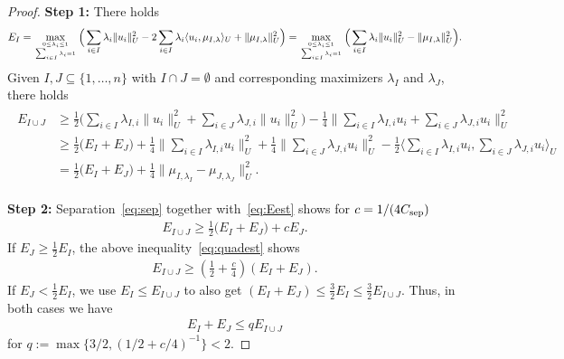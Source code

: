 \documentclass[10pt,reqno]{amsart}
\theoremstyle{definition}
\theoremstyle{remark}
\newcommand{\norm}[1]{\lVert #1\rVert}
\newcommand{\dual}[2]{\langle #1,#2\rangle}
\begin{document}
\begin{proof}
    \textbf{Step 1:} 
    There holds
    \begin{align}
        E_I = \max_{0\leq \lambda_i\leq 1\atop \sum_{i\in I} \lambda_i = 1}\Big(\sum_{i\in I}\lambda_i \norm{u_i}_U^2  - 2\sum_{i\in I}\lambda_i \dual{u_i}{\mu_{I,\lambda}}_U+\norm{\mu_{I,\lambda}}_U^2\Big) = \max_{0\leq \lambda_i\leq 1\atop \sum_{i\in I} \lambda_i = 1} \Big(\sum_{i\in I}\lambda_i \norm{u_i}_U^2  - \norm{\mu_{I,\lambda}}_U^2\Big). 
    \end{align}
    Given $I,J\subseteq \{1,\ldots,n\}$ with $I\cap J = \emptyset$ and corresponding maximizers $\lambda_I$ and $\lambda_{J}$, there holds
    \begin{align}\label{eq:Eest}
    \begin{split}
        E_{I\cup J} &\geq  \frac12\Big(\sum_{i\in I}\lambda_{I,i} \norm{u_i}_U^2+\sum_{i\in J}\lambda_{J,i} \norm{u_i}_U^2\Big)-\frac14\norm{\sum_{i\in I}\lambda_{I,i}u_i+\sum_{i\in J}\lambda_{J,i}u_i}_U^2\\
        &\geq  \frac12\Big(E_I + E_{J}\Big)+\frac14\norm{\sum_{i\in I}\lambda_{I,i}u_i}_U^2+\frac14\norm{\sum_{i\in J}\lambda_{J,i}u_i}_U^2
        -\frac12 \dual{\sum_{i\in I}\lambda_{I,i}u_i}{\sum_{i\in J}\lambda_{J,i}u_i}_U\\
        &=
        \frac12\Big(E_I + E_{J}\Big)+\frac14\norm{\mu_{I,\lambda_I}-\mu_{J,\lambda_{J}}}_U^2.
        \end{split}
    \end{align}

    \textbf{Step 2:}    
    Separation~\eqref{eq:sep} together with~\eqref{eq:Eest} shows for $c = 1/(4C_{\rm sep})$
    \begin{align}\label{eq:quadest}
        E_{I\cup J}\geq \frac12\Big(E_I + E_{J}\Big)+cE_{J}.
    \end{align}
    If $E_{J}\geq \frac12 E_I$, the above inequality~\eqref{eq:quadest} shows
    \begin{align*}
        E_{I\cup J}\geq (\frac{1}{2}+\frac{c}{4})(E_I+E_{J}).
    \end{align*}
    If $E_{J}<\frac12 E_I$, we use $E_I \leq E_{I \cup J}$ to also get $(E_I+E_{J})\leq \frac32 E_I\leq \frac32 E_{I\cup J}$.
    Thus, in both cases we have 
    \begin{align}\label{eq:reduction}
    E_I+E_{J}\leq qE_{I\cup J}
    \end{align}
    for $q:=\max\{3/2,(1/2+c/4)^{-1}\}<2$.


\end{proof}
\end{document}
